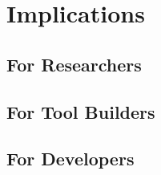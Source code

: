 \section{Implications}\label{implications}
\subsection{For Researchers}
\subsection{For Tool Builders}
\subsection{For Developers}